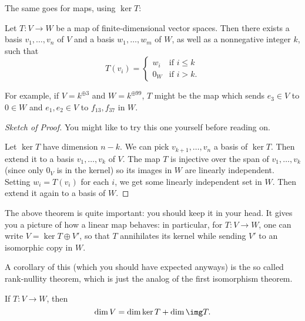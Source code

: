 The same goes for maps, using $\ker T$:
\begin{theorem}
	Let $T:V\to W$ be a map of finite-dimensional vector spaces. 
	Then there exists a basis $v_1, \dots, v_n$ of $V$
	and a basis $w_1, \dots, w_m$ of $W$,
	as well as a nonnegative integer $k$, such that
	\[
		T(v_i) =
		\begin{cases}
			w_i & \text{if $i \le k$} \\
			0_W & \text{if $i > k$}.
		\end{cases}
	\]
	\label{thm:linear_map_basis}
\end{theorem}
For example, if $V = k^{\oplus 3}$ and $W = k^{\oplus 99}$,
$T$ might be the map which sends $e_3 \in V$ to $0 \in W$
and $e_1, e_2 \in V$ to $f_{13}, f_{37}$ in $W$.
\begin{proof}[Sketch of Proof]
	You might like to try this one yourself before reading on.

	Let $\ker T$ have dimension $n-k$.
	We can pick $v_{k+1}, \dots, v_{n}$ a basis of $\ker T$.
	Then extend it to a basis $v_1, \dots, v_k$ of $V$.
	The map $T$ is injective over the span of $v_1, \dots, v_k$
	(since only $0_V$ is in the kernel) so its images in $W$ are linearly independent.
	Setting $w_i = T(v_i)$ for each $i$,
	we get some linearly independent set in $W$.
	Then extend it again to a basis of $W$.
\end{proof}

The above theorem is quite important: you should keep it in your head.
It gives you a picture of how a linear map behaves:
in particular, for $T : V \to W$, 
one can write $V = \ker T \oplus V'$,
so that $T$ annihilates its kernel while sending $V'$
to an isomorphic copy in $W$.

A corollary of this (which you should have expected anyways) is the so called rank-nullity theorem,
which is just the analog of the first isomorphism theorem.
\begin{theorem}
	\label{thm:rank_nullity}
	If $T : V \to W$, then 
	\[ \dim V = \dim \ker T + \dim \img T. \]
\end{theorem}

